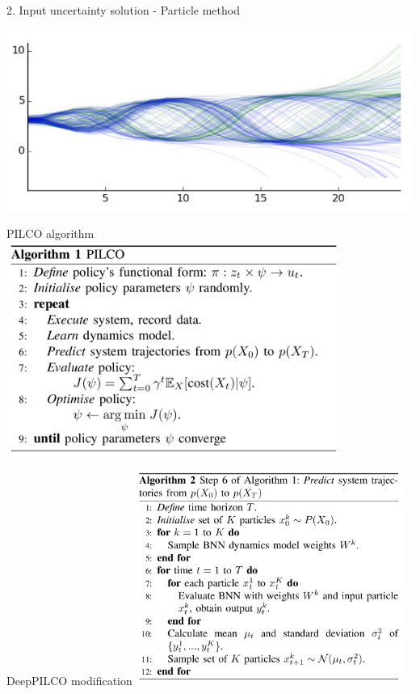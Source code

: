 \documentclass{beamer}
\begin{document}
\begin{frame}{2. Input uncertainty solution - Particle method}
\begin{center}
    \includegraphics[width=\textwidth]{img/particles.png}
\end{center}
\end{frame}

\begin{frame}{PILCO algorithm}
    \includegraphics[height=7cm]{img/pilco-algo.png}
\end{frame}

\begin{frame}{DeepPILCO modification}
    \includegraphics[height=7cm]{img/deep-algo.png}
\end{frame}
\end{document}

